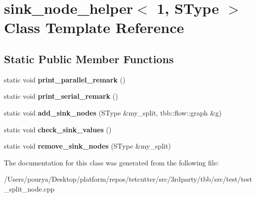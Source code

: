 \hypertarget{classsink__node__helper_3_011_00_01SType_01_4}{}\section{sink\+\_\+node\+\_\+helper$<$ 1, S\+Type $>$ Class Template Reference}
\label{classsink__node__helper_3_011_00_01SType_01_4}
\subsection*{Static Public Member Functions}
\begin{DoxyCompactItemize}
\item 
\hypertarget{classsink__node__helper_3_011_00_01SType_01_4_a0324cec943874680257d8c1f51608ce4}{}static void {\bfseries print\+\_\+parallel\+\_\+remark} ()\label{classsink__node__helper_3_011_00_01SType_01_4_a0324cec943874680257d8c1f51608ce4}

\item 
\hypertarget{classsink__node__helper_3_011_00_01SType_01_4_a2767ababf001658b86b0505ed91afcb9}{}static void {\bfseries print\+\_\+serial\+\_\+remark} ()\label{classsink__node__helper_3_011_00_01SType_01_4_a2767ababf001658b86b0505ed91afcb9}

\item 
\hypertarget{classsink__node__helper_3_011_00_01SType_01_4_a26999eed17e88a3aa710e3e432741122}{}static void {\bfseries add\+\_\+sink\+\_\+nodes} (S\+Type \&my\+\_\+split, tbb\+::flow\+::graph \&g)\label{classsink__node__helper_3_011_00_01SType_01_4_a26999eed17e88a3aa710e3e432741122}

\item 
\hypertarget{classsink__node__helper_3_011_00_01SType_01_4_aaf69b9e263c8449465897b2611c0118d}{}static void {\bfseries check\+\_\+sink\+\_\+values} ()\label{classsink__node__helper_3_011_00_01SType_01_4_aaf69b9e263c8449465897b2611c0118d}

\item 
\hypertarget{classsink__node__helper_3_011_00_01SType_01_4_a6e88d5d9cf06c1ca450869bf894735b4}{}static void {\bfseries remove\+\_\+sink\+\_\+nodes} (S\+Type \&my\+\_\+split)\label{classsink__node__helper_3_011_00_01SType_01_4_a6e88d5d9cf06c1ca450869bf894735b4}

\end{DoxyCompactItemize}


The documentation for this class was generated from the following file\+:\begin{DoxyCompactItemize}
\item 
/\+Users/pourya/\+Desktop/platform/repos/tetcutter/src/3rdparty/tbb/src/test/test\+\_\+split\+\_\+node.\+cpp\end{DoxyCompactItemize}

